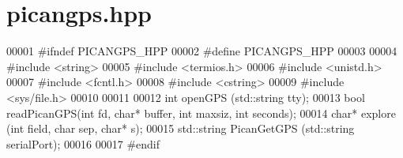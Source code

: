 \hypertarget{picangps_8hpp_source}{}\section{picangps.\+hpp}
\label{picangps_8hpp_source}

\begin{DoxyCode}
00001 \textcolor{preprocessor}{#ifndef PICANGPS\_HPP}
00002 \textcolor{preprocessor}{#define PICANGPS\_HPP}
00003 
00004 \textcolor{preprocessor}{#include <string>}
00005 \textcolor{preprocessor}{#include <termios.h>}
00006 \textcolor{preprocessor}{#include <unistd.h>}
00007 \textcolor{preprocessor}{#include <fcntl.h>}
00008 \textcolor{preprocessor}{#include <cstring>}
00009 \textcolor{preprocessor}{#include <sys/file.h>}
00010 
00011 
00012 \textcolor{keywordtype}{int} openGPS (std::string tty);
00013 \textcolor{keywordtype}{bool} readPicanGPS(\textcolor{keywordtype}{int} fd, \textcolor{keywordtype}{char}* buffer, \textcolor{keywordtype}{int} maxsiz, \textcolor{keywordtype}{int} seconds);
00014 \textcolor{keywordtype}{char}* explore (\textcolor{keywordtype}{int} field, \textcolor{keywordtype}{char} sep, \textcolor{keywordtype}{char}* s);
00015 std::string PicanGetGPS (std::string serialPort);
00016 
00017 \textcolor{preprocessor}{#endif}
\end{DoxyCode}
